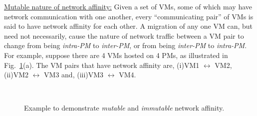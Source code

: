 \underline{Mutable nature of network affinity:} Given a set of VMs, some 
of which may have network communication with one another, every 
``communicating pair'' of VMs is said to have network affinity for each other.
A migration of any one VM can, but need not necessarily, cause the nature of
network traffic between a VM pair to change from being \textit{intra-PM}
to \textit{inter-PM}, or from being \textit{inter-PM} to \textit{intra-PM}.
For example, suppose there are 4 VMs hosted on 4 PMs, as illustrated
in Fig.~\ref{fig:mutable}(a). The VM pairs that have
network affinity are, (i)VM1 $\leftrightarrow$ VM2,
(ii)VM2 $\leftrightarrow$ VM3 and,
(iii)VM3 $\leftrightarrow$ VM4. 

\begin{figure}[h]
\begin{center}
	~~~~~~~~~~~~~~~~~~~~~~~~~~
	\caption{Example to demonstrate \textit{mutable} and \textit{immutable} network affinity.}
\label{fig:mutable}
\end{center}
\end{figure}

